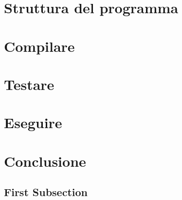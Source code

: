 \documentclass[12pt, a4paper]{article} %
\begin{document}
\section{Struttura del programma}

\section{Compilare}
\section{Testare}  %
\section{Eseguire} %
\section{Conclusione}

\subsection{First Subsection} %
\end{document}
